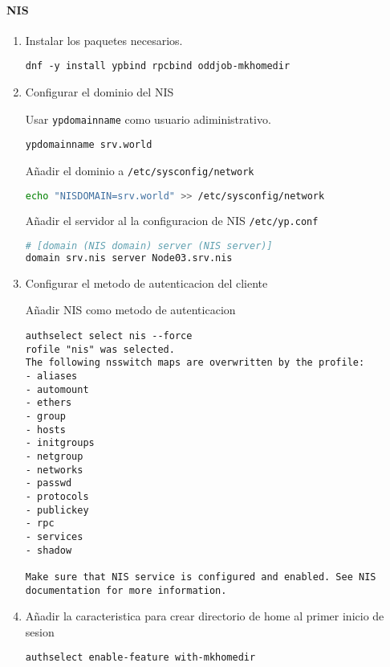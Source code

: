 \documentclass[../main.tex]{subfiles}
\begin{document}
\paragraph{NIS}
\begin{enumerate}
\item Instalar los paquetes necesarios.
  \begin{lstlisting}
dnf -y install ypbind rpcbind oddjob-mkhomedir
\end{lstlisting}

\item Configurar el dominio del NIS

  Usar \lstinline|ypdomainname| como usuario adiministrativo.
  \begin{lstlisting}
ypdomainname srv.world
\end{lstlisting}
  Añadir el dominio a \lstinline|/etc/sysconfig/network|
  \begin{lstlisting}[language=bash,label={list:sysnetwork},caption=Modificación del archivo /etc/sysconfig/network]
echo "NISDOMAIN=srv.world" >> /etc/sysconfig/network 
\end{lstlisting}
  Añadir el servidor al la configuracion de NIS \lstinline|/etc/yp.conf|
  \begin{lstlisting}[language=bash,label={list:yp},caption=Modificación del archivo /etc/yp.conf]
# [domain (NIS domain) server (NIS server)]
domain srv.nis server Node03.srv.nis 
\end{lstlisting}
     
\item Configurar el metodo de autenticacion del cliente
 
  Añadir NIS como metodo de autenticacion

  \begin{lstlisting}
authselect select nis --force
rofile "nis" was selected.
The following nsswitch maps are overwritten by the profile:
- aliases
- automount
- ethers
- group
- hosts
- initgroups
- netgroup
- networks
- passwd
- protocols
- publickey
- rpc
- services
- shadow

Make sure that NIS service is configured and enabled. See NIS documentation for more information.
\end{lstlisting}

\item Añadir la caracteristica para crear directorio de home al
  primer inicio de sesion

  \begin{lstlisting}
authselect enable-feature with-mkhomedir   
\end{lstlisting}


\end{enumerate}
\end{document}
